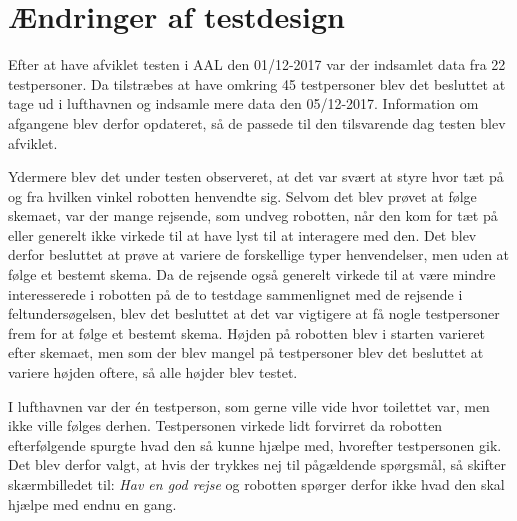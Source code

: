\section{Ændringer af testdesign}
\label{TestAfSkalaerAendringerTD}
%
Efter at have afviklet testen i AAL den 01/12-2017 var der indsamlet data fra 22 testpersoner. Da tilstræbes at have omkring 45 testpersoner blev det besluttet at tage ud i lufthavnen og indsamle mere data den 05/12-2017. Information om afgangene blev derfor opdateret, så de passede til den tilsvarende dag testen blev afviklet. 

Ydermere blev det under testen observeret, at det var svært at styre hvor tæt på og fra hvilken vinkel robotten henvendte sig. Selvom det blev prøvet at følge skemaet, var der mange rejsende, som undveg robotten, når den kom for tæt på eller generelt ikke virkede til at have lyst til at interagere med den. Det blev derfor besluttet at prøve at variere de forskellige typer henvendelser, men uden at følge et bestemt skema. Da de rejsende også generelt virkede til at være mindre interesserede i robotten på de to testdage sammenlignet med de rejsende i feltundersøgelsen, blev det besluttet at det var vigtigere at få nogle testpersoner frem for at følge et bestemt skema. Højden på robotten blev i starten varieret efter skemaet, men som der blev mangel på testpersoner blev det besluttet at variere højden oftere, så alle højder blev testet.

I lufthavnen var der én testperson, som gerne ville vide hvor toilettet var, men ikke ville følges derhen. Testpersonen virkede lidt forvirret da robotten efterfølgende spurgte hvad den så kunne hjælpe med, hvorefter testpersonen gik. Det blev derfor valgt, at hvis der trykkes nej til pågældende spørgsmål, så skifter skærmbilledet til: \textit{Hav en god rejse} og robotten spørger derfor ikke hvad den skal hjælpe med endnu en gang.

